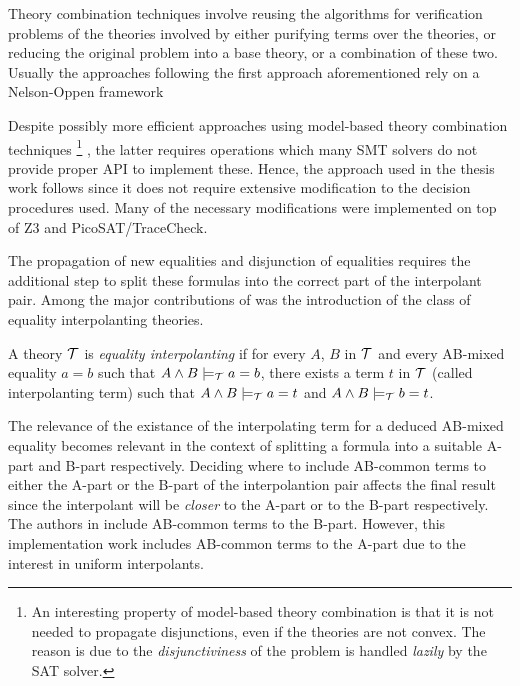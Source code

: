 Theory combination techniques involve 
reusing the algorithms for verification 
problems of the theories involved 
by either purifying terms over the 
theories, or reducing the original problem 
into a base theory, or a combination of these two. 
Usually the approaches following the first approach 
aforementioned rely on a Nelson-Oppen
framework \cite{10.1007/11532231_26, 
10.1007/978-3-642-22119-4_1, 10.1145/2490253}

Despite possibly more efficient approaches using
model-based theory combination techniques 
\footnote{
  An interesting property of model-based theory combination 
  is that it is not needed to propagate disjunctions, even if
  the theories are not convex. The reason is due to 
  the \emph{disjunctiviness} of the problem is handled 
  \emph{lazily} by the
  SAT solver.
} \cite{10.1007/978-3-642-22119-4_1}, the latter requires 
operations which many SMT solvers do not provide 
proper API to implement these.
Hence, the approach used in the thesis work follows 
\cite{10.1007/11532231_26} since it does not require extensive
modification to the decision procedures
used. Many of the necessary modifications 
were implemented on top of Z3 and PicoSAT/TraceCheck.

The propagation of new equalities and disjunction of equalities
requires the additional step to split these formulas into
the correct part of the interpolant pair. Among the major
contributions of \cite{10.1007/11532231_26} was the introduction
of the class of equality interpolanting theories.

\begin{definition}
  A theory $\cal{T}$ is \emph{equality interpolanting}
  if for every $A$, $B$ in $\cal{T}$ and every AB-mixed
  equality $a = b$ such that $A \land B \models_{\cal{T}} a = b$,
  there exists a term $t$
  in $\cal{T}$ (called interpolanting term)
  such that $A \land B \models_{\cal{T}} a = t$ and 
  $A \land B \models_{\cal{T}} b = t$.
\end{definition}

The relevance of the existance of the interpolating term for 
a deduced AB-mixed equality becomes relevant in the context 
of splitting a formula into a suitable A-part and B-part 
respectively. 
Deciding where to include AB-common terms to either the 
A-part or the B-part of the interpolantion pair affects 
the final result since the interpolant will be \emph{closer} 
to the A-part or to the B-part respectively. The authors in 
\cite{10.1007/11532231_26} include AB-common terms to the B-part. 
However, this implementation work includes AB-common terms to the
A-part due to the interest in uniform interpolants.

